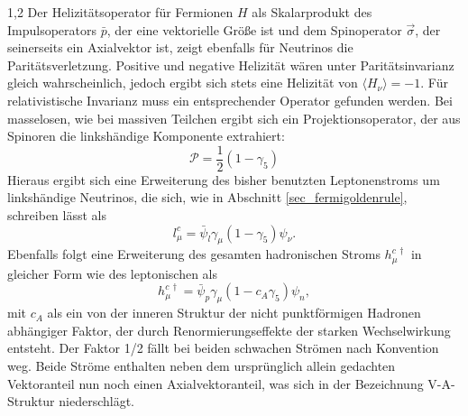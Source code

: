 \documentclass[11pt,a4paper,twoside]{report}
\begin{document}
\begin{spacing}{1,2}
\noindent
Der Helizitätsoperator für Fermionen $H$ als Skalarprodukt des Impulsoperators $\bar p$, der eine vektorielle Größe ist und dem Spinoperator $\vec \sigma$, 
der seinerseits ein Axialvektor ist, zeigt ebenfalls für Neutrinos die Paritätsverletzung. Positive und negative Helizität wären unter
Paritätsinvarianz gleich wahrscheinlich, jedoch ergibt sich stets eine Helizität von $\langle H_\nu \rangle= -1$. Für relativistische
Invarianz muss ein entsprechender Operator gefunden werden. Bei masselosen, wie bei massiven Teilchen ergibt sich ein Projektionsoperator, der aus Spinoren 
die linkshändige Komponente extrahiert:
\begin{equation}
 \mathcal{P} = \frac12(1-\gamma_5)
\end{equation}
Hieraus ergibt sich eine Erweiterung des bisher benutzten Leptonenstroms um linkshändige Neutrinos, die sich, wie in Abschnitt \ref{sec_fermigoldenrule}, schreiben lässt als
\begin{equation}
 l_\mu^c = \bar \psi_l \gamma_\mu (1-\gamma_5) \psi_\nu.
\end{equation}
Ebenfalls folgt eine Erweiterung des gesamten hadronischen Stroms $h_\mu^{c\,\dagger}$ in gleicher Form wie des leptonischen als
\begin{equation}
 h_\mu^{c\,\dagger} = \bar \psi_p \gamma_\mu(1-c_A\gamma_5)\psi_n,
\end{equation}
mit $c_A$ als ein von der inneren Struktur der nicht punktförmigen Hadronen abhängiger Faktor, der durch Renormierungseffekte der starken Wechselwirkung entsteht.
Der Faktor 1/2 fällt bei beiden schwachen Strömen nach Konvention weg. 
Beide Ströme enthalten neben dem ursprünglich allein gedachten Vektoranteil nun noch einen Axialvektoranteil, was sich in der Bezeichnung V-A-Struktur
niederschlägt.


\end{spacing}
\end{document}
